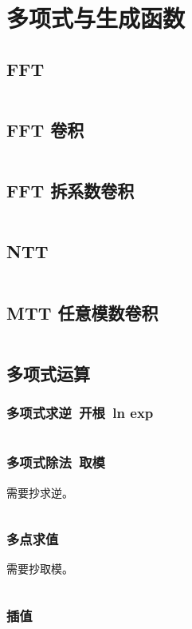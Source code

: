 \section{多项式与生成函数}
				\subsection{FFT}
					\inputminted{cpp}{sections/Polynomial/assets/Math/FFT.cpp}
				\subsection{FFT 卷积}
					\inputminted{cpp}{sections/Polynomial/assets/Math/FFT卷积.cpp}
				\subsection{FFT 拆系数卷积}
					\inputminted{cpp}{sections/Polynomial/assets/Math/FFT拆系数卷积.cpp}
				\subsection{NTT}
					\inputminted{cpp}{sections/Polynomial/assets/Math/NTT.cpp}
				\subsection{MTT 任意模数卷积}
					\inputminted{cpp}{sections/Polynomial/assets/Math/MTT.cpp}
				\subsection{多项式运算}
					\subsubsection{多项式求逆\ 开根\ ln exp}
						\inputminted{cpp}{sections/Polynomial/assets/Math/多项式运算.cpp}
					\subsubsection{多项式除法\ 取模}
						需要抄求逆。
						\inputminted{cpp}{sections/Polynomial/assets/Math/多项式取模.cpp}
					\subsubsection{多点求值}
						需要抄取模。
						\inputminted{cpp}{sections/Polynomial/assets/Math/多点求值.cpp}
					\subsubsection{插值}
						
